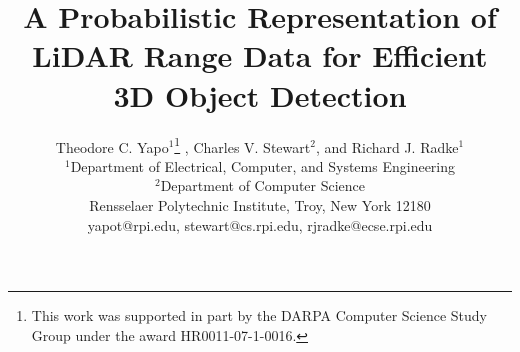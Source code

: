 \documentclass[10pt]{article}
\begin{document}
\title{A Probabilistic Representation of LiDAR Range Data for
  Efficient 3D Object Detection 
%
}

\author{Theodore C. Yapo$^1$\thanks{This work was supported in part by the DARPA Computer Science Study Group under the award HR0011-07-1-0016.}
, Charles V. Stewart$^2$, and Richard J. Radke$^1$\\
$^1$Department of Electrical, Computer, and Systems Engineering\\
$^2$Department of Computer Science\\
Rensselaer Polytechnic Institute, Troy, New York 12180\\
yapot@rpi.edu, stewart@cs.rpi.edu, rjradke@ecse.rpi.edu
}

\maketitle
\end{document}
